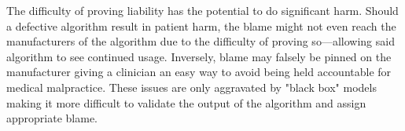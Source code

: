 \documentclass[]{article}
\begin{document}
			The difficulty of proving liability has the potential to do significant harm. Should a defective algorithm result in patient harm, the blame might not even reach the manufacturers of the algorithm due to the difficulty of proving so---allowing said algorithm to see continued usage. Inversely, blame may falsely be pinned on the manufacturer giving a clinician an easy way to avoid being held accountable for medical malpractice. These issues are only aggravated by "black box" models making it more difficult to validate the output of the algorithm and assign appropriate blame.


		
		

\end{document}
